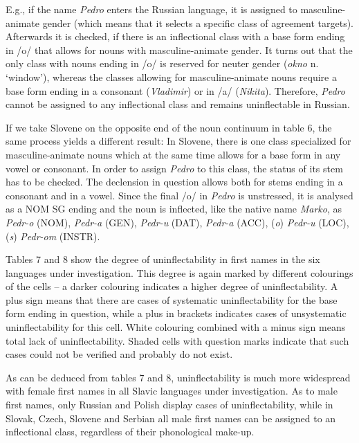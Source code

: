 \documentclass[output=paper]{langscibook}
\begin{document}
E.g., if the name \textit{Pedro} enters the Russian language, it is assigned to masculine-animate gender (which means that it selects a specific class of agreement targets). Afterwards it is checked, if there is an inflectional class with a base form ending in /o/ that allows for nouns with masculine-animate gender. It turns out that the only class with nouns ending in /o/ is reserved for neuter gender (\textit{okno} n. ‘window’), whereas the classes allowing for masculine-animate nouns require a base form ending in a consonant (\textit{Vladimir}) or in /a/ (\textit{Nikita}). Therefore, \textit{Pedro} cannot be assigned to any inflectional class and remains uninflectable in Russian.

If we take Slovene on the opposite end of the noun continuum in table 6, the same process yields a different result: In Slovene, there is one class specialized for masculine-animate nouns which at the same time allows for a base form in any vowel or consonant. In order to assign \textit{Pedro} to this class, the status of its stem has to be checked. The declension in question allows both for stems ending in a consonant and in a vowel. Since the final /o/ in \textit{Pedro} is unstressed, it is analysed as a NOM SG ending and the noun is inflected, like the native name \textit{Marko}, as \textit{Pedr-o} (NOM), \textit{Pedr-a} (GEN), \textit{Pedr-u} (DAT), \textit{Pedr-a} (ACC), (\textit{o}) \textit{Pedr-u} (LOC), (\textit{s}) \textit{Pedr-om} (INSTR). 

Tables 7 and 8 show the degree of uninflectability in first names in the six languages under investigation. This degree is again marked by different colourings of the cells – a darker colouring indicates a higher degree of uninflectability. A plus sign means that there are cases of systematic uninflectability for the base form ending in question, while a plus in brackets indicates cases of unsystematic uninflectability for this cell. White colouring combined with a minus sign means total lack of uninflectability. Shaded cells with question marks indicate that such cases could not be verified and probably do not exist.

As can be deduced from tables 7 and 8, uninflectability is much more widespread with female first names in all Slavic languages under investigation. As to male first names, only Russian and Polish display cases of uninflectability, while in Slovak, Czech, Slovene and Serbian all male first names can be assigned to an inflectional class, regardless of their phonological make-up.
\end{document}
